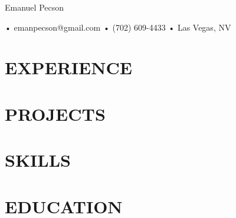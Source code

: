 \documentclass[letterpaper,10pt]{article}
\begin{document}
\begin{center}
  {\fontsize{20}{20}\robotoregular Emanuel Pecson} \\

	\vspace{0.5em}

	\hspace{0.6em}•\hspace{0.6em}
	emanpecson@gmail.com
	\hspace{0.6em}•\hspace{0.6em}
	(702) 609-4433
	\hspace{0.6em}•\hspace{0.6em}
	Las Vegas, NV
\end{center}

\section*{EXPERIENCE}




\section*{PROJECTS}



\section*{SKILLS}


\section*{EDUCATION}

\end{document}
